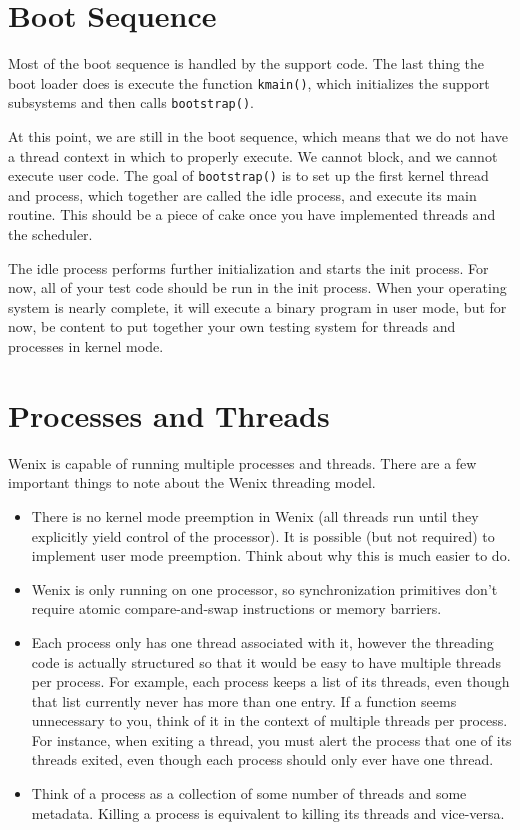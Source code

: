 \section{Boot Sequence}

Most of the boot sequence is handled by the support code. The last thing the boot loader does is execute the function \texttt{kmain()}, which initializes the support subsystems and then calls \texttt{bootstrap()}.

At this point, we are still in the boot sequence, which means that we do not have a thread context in which to properly execute. We cannot block, and we cannot execute user code. The goal of \texttt{bootstrap()} is to set up the first kernel thread and process, which together are called the idle process, and execute its main routine. This should be a piece of cake once you have implemented threads and the scheduler.

The idle process performs further initialization and starts the init process. For now, all of your test code should be run in the init process. When your operating system is nearly complete, it will execute a binary program in user mode, but for now, be content to put together your own testing system for threads and processes in kernel mode.

\section{Processes and Threads}

Wenix is capable of running multiple processes and threads. There are a few important things to note about the Wenix threading model.
\begin{itemize}
    \item There is no kernel mode preemption in Wenix (all threads run until they explicitly yield control of the processor). It is possible (but not required) to implement user mode preemption. Think about why this is much easier to do.
    \item Wenix is only running on one processor, so synchronization primitives don't require atomic compare-and-swap instructions or memory barriers.
    \item Each process only has one thread associated with it, however the threading code is actually structured so that it would be easy to have multiple threads per process. For example, each process keeps a list of its threads, even though that list currently never has more than one entry. If a function seems unnecessary to you, think of it in the context of multiple threads per process. For instance, when exiting a thread, you must alert the process that one of its threads exited, even though each process should only ever have one thread.
     \item Think of a process as a collection of some number of threads and some metadata. Killing a process is equivalent to killing its threads and vice-versa.
\end{itemize}

